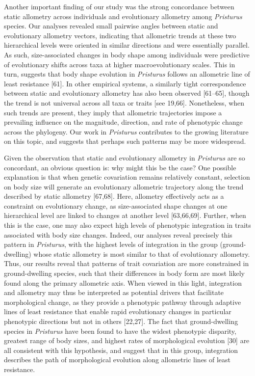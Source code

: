 \documentclass[
  11pt,
]{article}
\begin{document}
Another important finding of our study was the strong concordance
between static allometry across individuals and evolutionary allometry
among \emph{Pristurus} species. Our analyses revealed small pairwise
angles between static and evolutionary allometry vectors, indicating
that allometric trends at these two hierarchical levels were oriented in
similar directions and were essentially parallel. As such,
size-associated changes in body shape among individuals were predictive
of evolutionary shifts across taxa at higher macroevolutionary scales.
This in turn, suggests that body shape evolution in \emph{Pristurus}
follows an allometric line of least resistance {[}61{]}. In other
empirical systems, a similarly tight correspondence between static and
evolutionary allometry has also been observed {[}61--65{]}, though the
trend is not universal across all taxa or traits {[}see 19,66{]}.
Nonetheless, when such trends are present, they imply that allometric
trajectories impose a prevailing influence on the magnitude, direction,
and rate of phenotypic change across the phylogeny. Our work in
\emph{Pristurus} contributes to the growing literature on this topic,
and suggests that perhaps such patterns may be more
widespread.\hfill\break

Given the observation that static and evolutionary allometry in
\emph{Pristurus} are so concordant, an obvious question is: why might
this be the case? One possible explanation is that when genetic
covariation remains relatively constant, selection on body size will
generate an evolutionary allometric trajectory along the trend described
by static allometry {[}67,68{]}. Here, allometry effectively acts as a
constraint on evolutionary change, as size-associated shape changes at
one hierarchical level are linked to changes at another level
{[}63,66,69{]}. Further, when this is the case, one may also expect high
levels of phenotypic integration in traits associated with body size
changes. Indeed, our analyses reveal precisely this pattern in
\emph{Pristurus}, with the highest levels of integration in the group
(ground-dwelling) whose static allometry is most similar to that of
evolutionary allometry. Thus, our results reveal that patterns of trait
covariation are more constrained in ground-dwelling species, such that
their differences in body form are most likely found along the primary
allometric axis. When viewed in this light, integration and allometry
may thus be interpreted as potential drivers that facilitate
morphological change, as they provide a phenotypic pathway through
adaptive lines of least resistance that enable rapid evolutionary
changes in particular phenotypic directions but not in others
{[}22,27{]}. The fact that ground-dwelling species in \emph{Pristurus}
have been found to have the widest phenotypic disparity, greatest range
of body sizes, and highest rates of morphological evolution {[}30{]} are
all consistent with this hypothesis, and suggest that in this group,
integration describes the path of morphological evolution along
allometric lines of least resistance. \hfill\break
\end{document}
